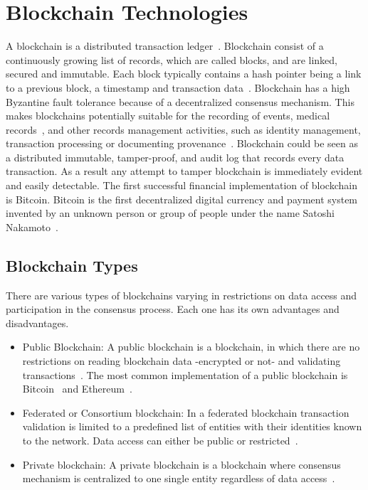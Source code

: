 \chapter{Blockchain Technologies}
\label{blockchain_technologies}

A blockchain is a distributed transaction ledger~\cite{nakamoto2012bitcoin}.
Blockchain consist of a continuously growing list of records, which are called blocks, and are linked, secured and immutable.
Each block typically contains a hash pointer being a link to a previous block, a timestamp and transaction data~\cite{wiki:blockchain}.
Blockchain has a high Byzantine fault tolerance because of a decentralized consensus mechanism.
This makes blockchains potentially suitable for the recording of events, medical records~\cite{blockchain_ehr,Azaria2016}, and other records management activities,
such as identity management, transaction processing or documenting provenance~\cite{wiki:blockchain}. Blockchain could be seen as a distributed immutable, tamper-proof,
and audit log that records every data transaction. As a result any attempt to tamper blockchain is immediately evident and easily detectable.
The first successful financial implementation of blockchain is Bitcoin.
Bitcoin is the first decentralized digital currency and payment system invented by an unknown person or group of people under the name Satoshi Nakamoto~\cite{nakamoto2012bitcoin,wiki:bitcoin}.

\section{Blockchain Types}\label{bltech:blockchain_types}

There are various types of blockchains varying in restrictions on data access and participation in the consensus process.
Each one has its own advantages and disadvantages.

\begin{itemize}
  \item Public Blockchain: A public blockchain is a blockchain, in which there are no restrictions on reading blockchain data -encrypted or not- and validating transactions~\cite{prbc_vs_pubbc}.
  The most common implementation of a public blockchain is Bitcoin~\cite{nakamoto2012bitcoin} and Ethereum~\cite{ethash}.
  \item Federated or Consortium blockchain: In a federated blockchain transaction validation is limited to a predefined list of entities with their identities known to the network. Data access can either be public or restricted~\cite{prbc_vs_pubbc}.
  \item Private blockchain: A private blockchain is a blockchain where consensus mechanism is centralized to one single entity regardless of data access~\cite{prbc_vs_pubbc}.
\end{itemize}

